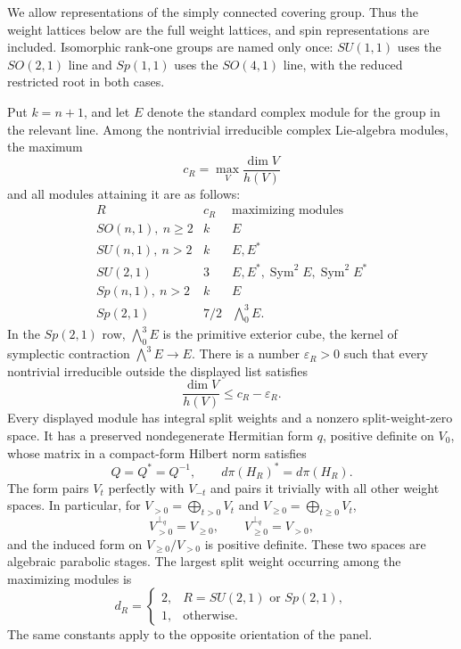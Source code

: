 We allow representations of the simply connected covering group. Thus
the weight lattices below are the full weight lattices, and spin
representations are included. Isomorphic rank-one groups are named only
once: $SU(1,1)$ uses the $SO(2,1)$ line and $Sp(1,1)$ uses the
$SO(4,1)$ line, with the reduced restricted root in both cases.

\begin{lemma}\label{lem:panels-optimal-modules}
Put $k=n+1$, and let $E$ denote the standard complex module for the
group in the relevant line. Among the nontrivial irreducible complex
Lie-algebra modules, the maximum
\[
 c_R=\max_V\frac{\dim V}{h(V)}
\]
and all modules attaining it are as follows:
\[
\begin{array}{ccl}
 R&c_R&\text{maximizing modules}\\ \hline
 SO(n,1),\ n\geq2&k&E\\
 SU(n,1),\ n>2&k&E,E^*\\
 SU(2,1)&3&E,E^*,\operatorname{Sym}^2E,
                         \operatorname{Sym}^2E^*\\
 Sp(n,1),\ n>2&k&E\\
 Sp(2,1)&7/2&\bigwedge^3_0E.
\end{array}
\]
In the $Sp(2,1)$ row, $\bigwedge^3_0E$ is the primitive exterior cube,
the kernel of symplectic contraction $\bigwedge^3E\to E$.
There is a number $\varepsilon_R>0$ such that every nontrivial
irreducible outside the displayed list satisfies
\[
 \frac{\dim V}{h(V)}\leq c_R-\varepsilon_R.
\]
Every displayed module has integral split weights and a nonzero
split-weight-zero space. It has a preserved nondegenerate Hermitian
form $q$, positive definite on $V_0$, whose matrix in a compact-form
Hilbert norm satisfies
\[
 Q=Q^*=Q^{-1},\qquad d\pi(H_R)^*=d\pi(H_R).
\]
The form pairs $V_t$ perfectly with $V_{-t}$ and pairs it trivially with
all other weight spaces. In particular, for
$V_{>0}=\bigoplus_{t>0}V_t$ and
$V_{\geq0}=\bigoplus_{t\geq0}V_t$,
\[
 V_{>0}^{\perp_q}=V_{\geq0},\qquad
 V_{\geq0}^{\perp_q}=V_{>0},
\]
and the induced form on $V_{\geq0}/V_{>0}$ is positive definite.
These two spaces are algebraic parabolic stages. The largest split
weight occurring among the maximizing modules is
\[
 d_R=\begin{cases}
 2,&R=SU(2,1)\text{ or }Sp(2,1),\\
 1,&\text{otherwise}.
 \end{cases}
\]
The same constants apply to the opposite orientation of the panel.
\end{lemma}

